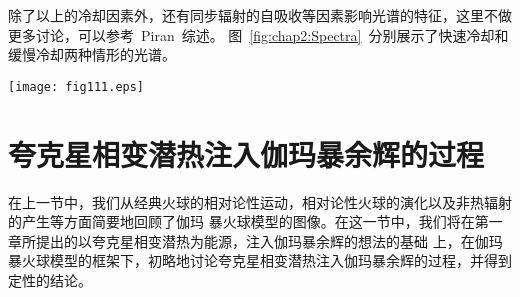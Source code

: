 																				除了以上的冷却因素外，还有同步辐射的自吸收等因素影响光谱的特征，这里不做更多讨论，可以参考~Piran~综述。
																				图~\ref{fig:chap2:Spectra}~分别展示了快速冷却和缓慢冷却两种情形的光谱。
																				\begin{figure*}
																				\centering
																				\texttt{[image: fig111.eps]}
																				\caption{
																					  幂率分布的电子在相对论性激波中的同步辐射谱。(a) 快速冷却的情形，
																							  一般认为在伽玛暴余辉的早期出现（$t<t_0$）。谱由 A，B，C，D 四个
																								  部分组成。自吸收在 $\nu_a$ 一下比较显著。特征频率， $\nu_m$，
																									  $\nu_c$，$\nu_a$ 随时间降低；箭头上方的量代表绝热的演化，下方方括号
																										  里的量代表完全的辐射的演化。(b) 缓慢冷却的情形，期待在晚期出现
																											  （$t>t_0$）。演化总是绝热的，四个部分为 E，F，G，H。
																				}
\label{fig:chap2:Spectra}
\end{figure*}

\section{夸克星相变潜热注入伽玛暴余辉的过程}

在上一节中，我们从经典火球的相对论性运动，相对论性火球的演化以及非热辐射的产生等方面简要地回顾了伽玛
暴火球模型的图像。在这一节中，我们将在第一章所提出的以夸克星相变潜热为能源，注入伽玛暴余辉的想法的基础
上，在伽玛暴火球模型的框架下，初略地讨论夸克星相变潜热注入伽玛暴余辉的过程，并得到定性的结论。

